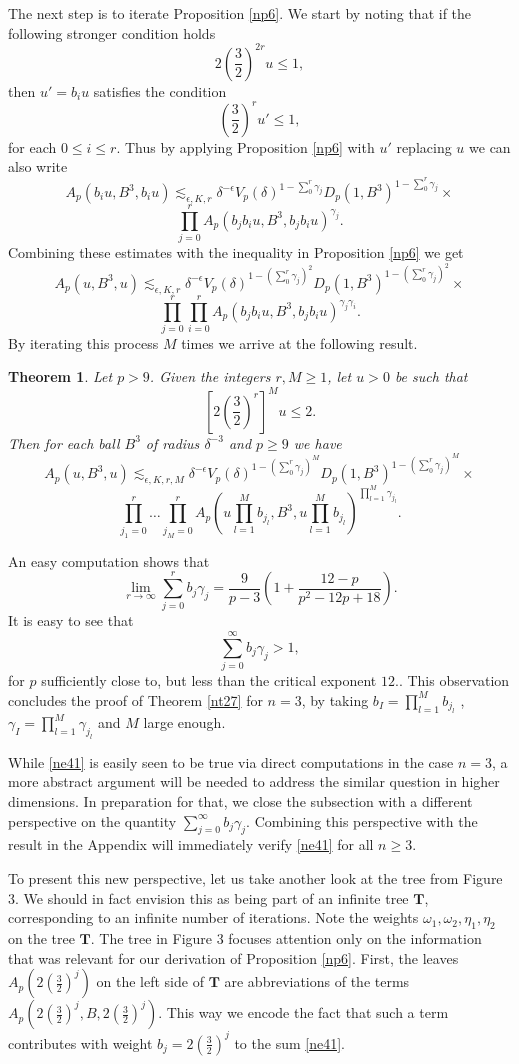 \documentclass[amssymb,amsfonts,12pt]{amsart}
\newtheorem{theorem}{Theorem}[section]
\begin{document}
The next step is to iterate Proposition \ref{np6}.
We start by noting that if the following stronger condition holds
$$2(\frac32)^{2r}u\le 1,$$
then $u'=b_iu$ satisfies the condition
$$(\frac32)^ru'\le 1,$$
for each $0\le i\le r$. Thus by applying Proposition \ref{np6} with $u'$ replacing $u$ we can also write
$$
A_p(b_iu,B^3,b_iu)\lesssim_{\epsilon,K,r}\delta^{-\epsilon}V_p(\delta)^{1-\sum_{0}^r\gamma_j}D_p(1,B^3)^{1-\sum_{0}^r\gamma_j}\times
$$
$$\prod_{j=0}^rA_p(b_jb_iu,B^3,b_jb_iu)^{\gamma_j}.$$
Combining these estimates with the inequality in Proposition \ref{np6} we get
$$
A_p(u,B^3,u)\lesssim_{\epsilon,K,r}\delta^{-\epsilon}V_p(\delta)^{1-(\sum_{0}^r\gamma_j)^2}D_p(1,B^3)^{1-(\sum_{0}^r\gamma_j)^2}\times
$$
$$\prod_{j=0}^r\prod_{i=0}^rA_p(b_jb_iu,B^3,b_jb_iu)^{\gamma_j\gamma_i}.$$
By iterating this process $M$ times we arrive at the following result.
\begin{theorem}
\label{nt7}
Let $p>9$. Given the integers $r,M\ge 1$,
let $u>0$ be such that
$$[2(\frac32)^r]^Mu\le 2
.$$
Then for each ball $B^3$ of radius $\delta^{-3}$ and $p\ge 9$ we have
$$
A_p(u,B^3,u)\lesssim_{\epsilon,K,r,M}\delta^{-\epsilon}V_p(\delta)^{1-(\sum_{0}^r\gamma_j)^M}D_p(1,B^3)^{1-(\sum_{0}^r\gamma_j)^M}\times
$$
$$\prod_{j_1=0}^r\ldots\prod_{j_M=0}^rA_p(u\prod_{l=1}^Mb_{j_l},B^3,u\prod_{l=1}^Mb_{j_l})^{\prod_{l=1}^M\gamma_{j_l}}.$$
\end{theorem}
\bigskip
An easy computation shows that
$$\lim_{r\to\infty}\sum_{j=0}^r b_j\gamma_j=\frac{9}{p-3}(1+\frac{12-p}{p^2-12p+18}).$$
It is easy to see that
\begin{equation}
\label{ne41}
\sum_{j=0}^\infty b_j\gamma_j>1,
\end{equation}
for $p$ sufficiently close to, but less than the critical exponent $12.$. This observation concludes the proof of Theorem \ref{nt27} for $n=3$, by taking $b_I=\prod_{l=1}^Mb_{j_l}$ , $\gamma_I=\prod_{l=1}^M\gamma_{j_l}$ and $M$ large enough.


While \eqref{ne41} is  easily seen to be true via direct computations in the case $n=3$, a more abstract argument will be needed to address the similar question in higher dimensions.
In preparation for that, we close the subsection with a different perspective on the quantity $\sum_{j=0}^\infty b_j\gamma_j$. Combining this perspective with the result in the Appendix will immediately verify \eqref{ne41} for all $n\ge 3$.


To present this new perspective, let us take another look at the tree from Figure 3. We should in fact envision this as being part of an infinite  tree $\textbf{T}$, corresponding to an infinite number of iterations.
Note the weights $\omega_1,\omega_2,\eta_1, \eta_2$ on the tree $\textbf{T}$. The tree in Figure 3 focuses attention only on the information that was  relevant for  our derivation of Proposition \ref{np6}. First, the leaves $A_p(2(\frac32)^j)$ on the left side of $\textbf{T}$ are abbreviations of the terms $A_p(2(\frac32)^j,B,2(\frac32)^j)$.
This way we  encode the fact that such a term contributes with weight $b_j=2(\frac32)^j$ to the sum \eqref{ne41}.
\end{document}
